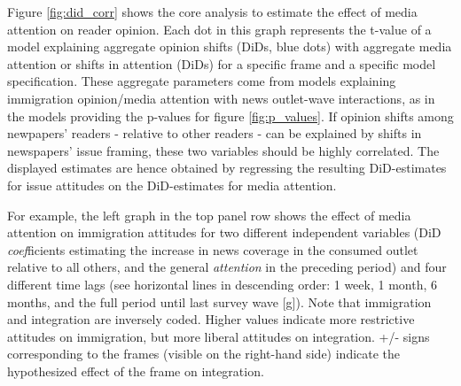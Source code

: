 \documentclass{article}
\begin{document}
Figure \ref{fig:did_corr} shows the core analysis to estimate the effect of media attention on reader opinion. Each dot in this graph represents the t-value of a model explaining aggregate opinion shifts (DiDs, blue dots) with aggregate media attention or shifts in attention (DiDs) for a specific frame and a specific model specification. These aggregate parameters come from models explaining immigration opinion/media attention with news outlet-wave interactions, as in the models providing the p-values for figure \ref{fig:p_values}. If opinion shifts among newpapers' readers - relative to other readers - can be explained by shifts in newspapers' issue framing, these two variables should be highly correlated. The displayed estimates are hence obtained by regressing the resulting DiD-estimates for issue attitudes on the DiD-estimates for media attention.

For example, the left graph in the top panel row shows the effect of media attention on immigration attitudes for two different independent variables (DiD \textit{coef}ficients estimating the increase in news coverage in the consumed outlet relative to all others, and the general \textit{attention} in the preceding period) and four different time lags (see horizontal lines in descending order: 1 week, 1 month, 6 months, and the full period until last survey wave [g]). Note that immigration and integration are inversely coded. Higher values indicate more restrictive attitudes on immigration, but more liberal attitudes on integration. +/- signs corresponding to the frames (visible on the right-hand side) indicate the hypothesized effect of the frame on integration.
\end{document}
